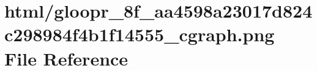 \hypertarget{gloopr__8f__aa4598a23017d824c298984f4b1f14555__cgraph_8png}{}\section{html/gloopr\+\_\+8f\+\_\+aa4598a23017d824c298984f4b1f14555\+\_\+cgraph.png File Reference}
\label{gloopr__8f__aa4598a23017d824c298984f4b1f14555__cgraph_8png}
